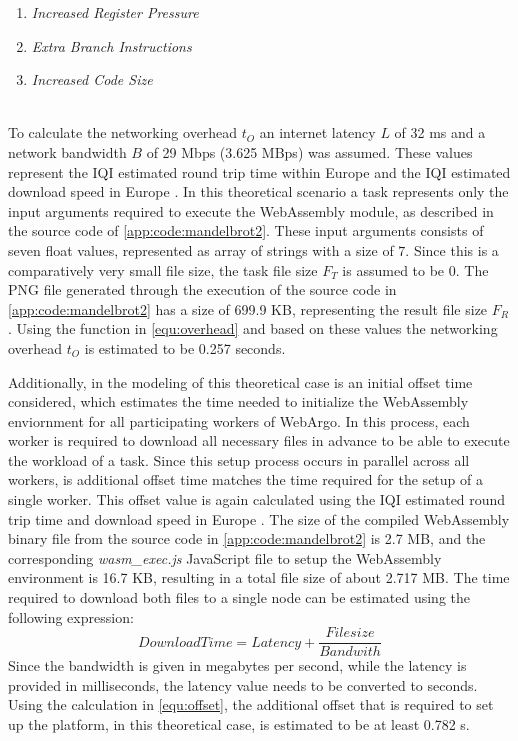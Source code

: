 \begin{enumerate}
  \item \emph{Increased Register Pressure}
  \item \emph{Extra Branch Instructions}
  \item \emph{Increased Code Size}
\end{enumerate}
~\\
To calculate the networking overhead $t_{O}$ an internet latency $L$ of 32 ms \cite{backend:latency} and a network bandwidth $B$ of 29 Mbps (3.625 MBps) \cite{backend:latency} was assumed. These values represent the \ac{IQI} estimated round trip time within Europe \cite{backend:latency} and the \ac{IQI} estimated download speed in Europe \cite{backend:latency}. In this theoretical scenario a task represents only the input arguments required to execute the WebAssembly module, as described in the source code of \autoref{app:code:mandelbrot2}. These input arguments consists of seven float values, represented as array of strings with a size of $7$. Since this is a comparatively very small file size, the task file size $F_{T}$ is assumed to be $0$. The \acs{PNG} file generated through the execution of the source code in \autoref{app:code:mandelbrot2} has a size of 699.9 KB, representing the result file size $F_{R}$. Using the function in \eqref{equ:overhead} and based on these values the networking overhead $t_{O}$ is estimated to be 0.257 seconds.

Additionally, in the modeling of this theoretical case is an initial offset time considered, which estimates the time needed to initialize the WebAssembly enviornment for all participating workers of WebArgo. In this process, each worker is required to download all necessary files in advance to be able to execute the workload of a task. Since this setup process occurs in parallel across all workers, is additional offset time matches the time required for the setup of a single worker. This offset value is again calculated using the \ac{IQI} estimated round trip time and download speed in Europe \cite{backend:latency}. The size of the compiled WebAssembly binary file from the source code in \autoref{app:code:mandelbrot2} is 2.7 MB, and the corresponding \emph{wasm\_exec.js} JavaScript file to setup the WebAssembly environment is 16.7 KB, resulting in a total file size of about 2.717 MB. The time required to download both files to a single node can be estimated using the following expression:
\begin{equation}
  DownloadTime = Latency + \frac{Filesize}{Bandwith} 
  \label{equ:offset}
\end{equation}
Since the bandwidth is given in megabytes per second, while the latency is provided in milliseconds, the latency value needs to be converted to seconds. Using the calculation in \eqref{equ:offset}, the additional offset that is required to set up the platform, in this theoretical case, is estimated to be at least 0.782 s.

